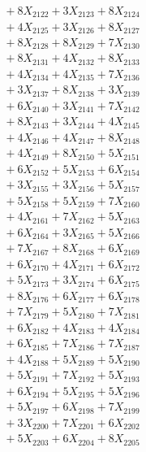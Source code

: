 \documentclass[a4paper,10pt]{article}
\begin{document}
{\begin{align}
&\;  + 8 X_{2122} + 3 X_{2123} + 8 X_{2124} \\[0.3ex]
&\;  + 4 X_{2125} + 3 X_{2126} + 8 X_{2127} \\[0.3ex]
&\;  + 8 X_{2128} + 8 X_{2129} + 7 X_{2130} \\[0.3ex]
&\;  + 8 X_{2131} + 4 X_{2132} + 8 X_{2133} \\[0.3ex]
&\;  + 4 X_{2134} + 4 X_{2135} + 7 X_{2136} \\[0.3ex]
&\;  + 3 X_{2137} + 8 X_{2138} + 3 X_{2139} \\[0.5ex]\allowbreak
&\;  + 6 X_{2140} + 3 X_{2141} + 7 X_{2142} \\[0.3ex]
&\;  + 8 X_{2143} + 3 X_{2144} + 4 X_{2145} \\[0.3ex]
&\;  + 4 X_{2146} + 4 X_{2147} + 8 X_{2148} \\[0.3ex]
&\;  + 4 X_{2149} + 8 X_{2150} + 5 X_{2151} \\[0.3ex]
&\;  + 6 X_{2152} + 5 X_{2153} + 6 X_{2154} \\[0.3ex]
&\;  + 3 X_{2155} + 3 X_{2156} + 5 X_{2157} \\[0.3ex]
&\;  + 5 X_{2158} + 5 X_{2159} + 7 X_{2160} \\[0.3ex]
&\;  + 4 X_{2161} + 7 X_{2162} + 5 X_{2163} \\[0.3ex]
&\;  + 6 X_{2164} + 3 X_{2165} + 5 X_{2166} \\[0.3ex]
&\;  + 7 X_{2167} + 8 X_{2168} + 6 X_{2169} \\[0.5ex]\allowbreak
&\;  + 6 X_{2170} + 4 X_{2171} + 6 X_{2172} \\[0.3ex]
&\;  + 5 X_{2173} + 3 X_{2174} + 6 X_{2175} \\[0.3ex]
&\;  + 8 X_{2176} + 6 X_{2177} + 6 X_{2178} \\[0.3ex]
&\;  + 7 X_{2179} + 5 X_{2180} + 7 X_{2181} \\[0.3ex]
&\;  + 6 X_{2182} + 4 X_{2183} + 4 X_{2184} \\[0.3ex]
&\;  + 6 X_{2185} + 7 X_{2186} + 7 X_{2187} \\[0.3ex]
&\;  + 4 X_{2188} + 5 X_{2189} + 5 X_{2190} \\[0.3ex]
&\;  + 5 X_{2191} + 7 X_{2192} + 5 X_{2193} \\[0.3ex]
&\;  + 6 X_{2194} + 5 X_{2195} + 5 X_{2196} \\[0.3ex]
&\;  + 5 X_{2197} + 6 X_{2198} + 7 X_{2199} \\[0.5ex]\allowbreak
&\;  + 3 X_{2200} + 7 X_{2201} + 6 X_{2202} \\[0.3ex]
&\;  + 5 X_{2203} + 6 X_{2204} + 8 X_{2205} \\[0.3ex]

\end{align}}
\end{document}
